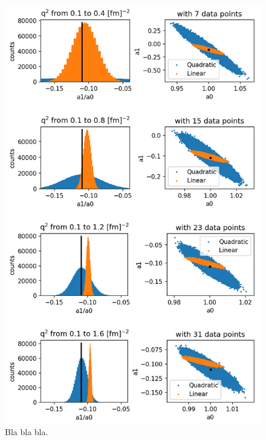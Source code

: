 \documentclass[10pt,aps,prc,twocolumn]{revtex4-1}
\begin{document}
\begin{figure}[htbp]
\includegraphics[width=\columnwidth]{Figure/zresult.png}
\caption{Bla bla bla.}
\end{figure}
\end{document}
